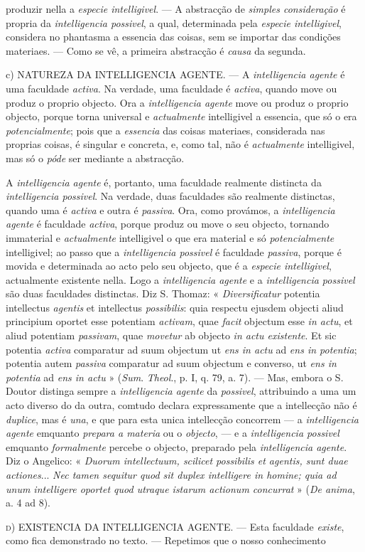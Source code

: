 produzir nella a \emph{especie intelligivel}. --- A abstracção de \emph{simples consideração} é propria da \emph{intelligencia possivel}, a qual, determinada pela \emph{especie intelligivel}, considera no phantasma a essencia das coisas, sem se importar das condições materiaes. --- Como se vê, a primeira abstracção é \emph{causa} da segunda.\par c) \textsc{NATUREZA} DA INTELLIGENCIA AGENTE. --- A \emph{intelligencia agente} é uma faculdade \emph{activa}. Na verdade, uma faculdade é \emph{activa}, quando move ou produz o proprio objecto. Ora a \emph{intelligencia agente} move ou produz o proprio objecto, porque torna universal e \emph{actualmente} intelligivel a essencia, que só o era \emph{potencialmente}; pois que a \emph{essencia} das coisas materiaes, considerada nas proprias coisas, é singular e concreta, e, como tal, não é \emph{actualmente} intelligivel, mas só o \emph{póde} ser mediante a abstracção.\par A \emph{intelligencia agente} é, portanto, uma faculdade realmente distincta da \emph{intelligencia possivel}. Na verdade, duas faculdades são realmente distinctas, quando uma é \emph{activa} e outra é \emph{passiva}. Ora, como provámos, a \emph{intelligencia agente} é faculdade \emph{activa}, porque produz ou move o seu objecto, tornando immaterial e \emph{actualmente} intelligivel o que era material e só \emph{potencialmente} intelligivel; ao passo que a \emph{intelligencia possivel} é faculdade \emph{passiva}, porque é movida e determinada ao acto pelo seu objecto, que é a \emph{especie intelligivel}, actualmente existente nella. Logo a \emph{intelligencia agente} e a \emph{intelligencia possivel} são duas faculdades distinctas. Diz S. Thomaz: « \emph{Diversificatur} potentia intellectus \emph{agentis} et intellectus \emph{possibilis}: quia respectu ejusdem objecti aliud principium oportet esse potentiam \emph{activam}, quae \emph{facit} objectum esse \emph{in actu}, et aliud potentiam \emph{passivam}, quae \emph{movetur} ab objecto \emph{in actu existente}. Et sic potentia \emph{activa} comparatur ad suum objectum ut \emph{ens in actu} ad \emph{ens in potentia}; potentia autem \emph{passiva} comparatur ad suum objectum e converso, ut \emph{ens in potentia} ad \emph{ens in actu} » (\emph{Sum}. \emph{Theol}., p. I, q. 79, a. 7). --- Mas, embora o S. Doutor distinga sempre a \emph{intelligencia agente} da \emph{possivel}, attribuindo a uma um acto diverso do da outra, comtudo declara expressamente que a intellecção não é \emph{duplice}, mas é \emph{una}, e que para esta unica intellecção concorrem --- a \emph{intelligencia agente} emquanto \emph{prepara a materia} ou o \emph{objecto}, --- e a \emph{intelligencia possivel} emquanto \emph{formalmente} percebe o objecto, preparado pela \emph{intelligencia agente}. Diz o Angelico: « \emph{Duorum intellectuum, scilicet possibilis et agentis, sunt duae actiones}... \emph{Nec tamen sequitur quod sit duplex intelligere in homine; quia ad unum intelligere oportet quod utraque istarum actionum concurrat} » (\emph{De anima}, a. 4 ad 8).\par \textsc{d}) \textsc{EXISTENCIA} DA INTELLIGENCIA AGENTE. --- Esta faculdade \emph{existe}, como fica demonstrado no texto. --- Repetimos que o nosso conhecimento 